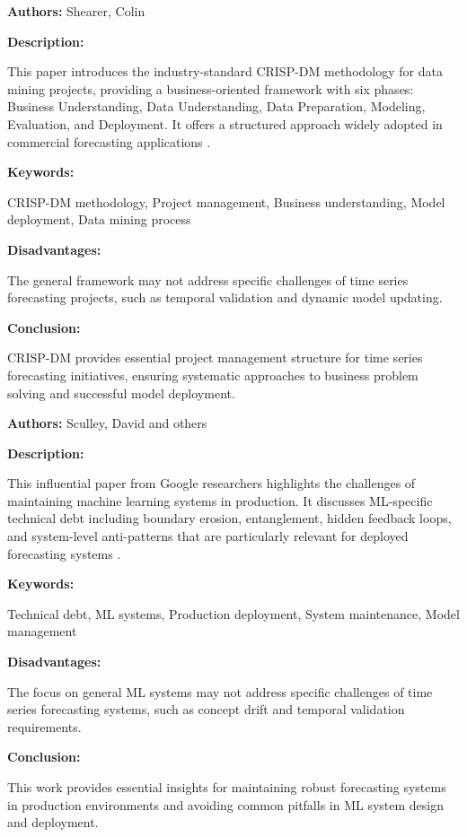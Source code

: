 
{ 
	
	\textbf{Authors:} Shearer, Colin
	
	\textbf{Description:}
	
	This paper introduces the industry-standard CRISP-DM methodology for data mining projects, providing a business-oriented framework with six phases: Business Understanding, Data Understanding, Data Preparation, Modeling, Evaluation, and Deployment. It offers a structured approach widely adopted in commercial forecasting applications \autocite{Shearer:2000}.
	
	\textbf{Keywords:}
	
	CRISP-DM methodology, Project management, Business understanding, Model deployment, Data mining process
	
	\textbf{Disadvantages:}
	
	The general framework may not address specific challenges of time series forecasting projects, such as temporal validation and dynamic model updating.
	
	\textbf{Conclusion:}
	
	CRISP-DM provides essential project management structure for time series forecasting initiatives, ensuring systematic approaches to business problem solving and successful model deployment.
	
}


{ 
	
	\textbf{Authors:} Sculley, David and others
	
	\textbf{Description:}
	
	This influential paper from Google researchers highlights the challenges of maintaining machine learning systems in production. It discusses ML-specific technical debt including boundary erosion, entanglement, hidden feedback loops, and system-level anti-patterns that are particularly relevant for deployed forecasting systems \autocite{Sculley:2015}.
	
	\textbf{Keywords:}
	
	Technical debt, ML systems, Production deployment, System maintenance, Model management
	
	\textbf{Disadvantages:}
	
	The focus on general ML systems may not address specific challenges of time series forecasting systems, such as concept drift and temporal validation requirements.
	
	\textbf{Conclusion:}
	
	This work provides essential insights for maintaining robust forecasting systems in production environments and avoiding common pitfalls in ML system design and deployment.
	
}

